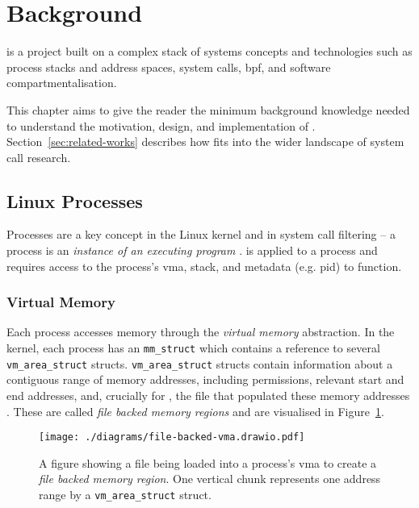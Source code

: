 
\section{Background}\label{sec:background}

\af is a project built on a complex stack of systems concepts and technologies
such as process stacks and address spaces, system calls, \ac{bpf}, and software
compartmentalisation. 

This chapter aims to give the reader the minimum background knowledge needed
to understand the motivation, design, and implementation of \af.
Section~\ref{sec:related-works} describes how \af fits into the wider landscape
of system call research.

\subsection{Linux Processes}

Processes are a key concept in the Linux kernel and in system call
filtering -- a process is an \textit{instance of an executing program} 
\cite{LINUX_PROGRAMMING_INTERFACE}. \af is applied to a process and requires 
access to the process's \ac{vma}, stack, and metadata (e.g. \ac{pid}) to 
function.

\subsubsection{Virtual Memory}\label{subsec:bgd-vmem}

Each process accesses memory through the \textit{virtual memory} abstraction.
In the kernel, each process has an \texttt{mm\_struct} which contains a
reference to several \texttt{vm\_area\_struct} structs. 
\texttt{vm\_area\_struct} structs contain information about a contiguous
range of memory addresses, including permissions, relevant start and end
addresses, and, crucially for \af, the file that populated these
memory addresses \cite{love2005linux}. These are called \textit{file backed
memory regions} and are visualised in Figure~\ref{fig:file-backed-vma}.

\begin{figure}[ht]
    \centering
    \texttt{[image: ./diagrams/file-backed-vma.drawio.pdf]} 
    \caption{A figure showing a file being loaded into a process's \ac{vma} to
    create a \textit{file backed memory region}. One vertical chunk represents
one address range by a \texttt{vm\_area\_struct} struct.}
    \label{fig:file-backed-vma}
\end{figure}

